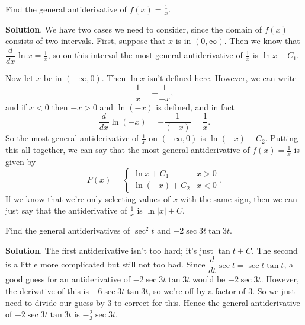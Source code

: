 \documentclass[10pt,]{book}
\theoremstyle{ptxplainnotitle}
\theoremstyle{ptxplaintitle}
\theoremstyle{ptxplainnotitle}
\theoremstyle{ptxplaintitle}
\theoremstyle{ptxplainnotitle}
\theoremstyle{ptxplaintitle}
\theoremstyle{ptxdefinitionnotitle}
\theoremstyle{ptxdefinitiontitle}
\theoremstyle{ptxdefinitionnotitle}
\theoremstyle{ptxdefinitiontitle}
\theoremstyle{ptxdefinitionnotitle}
\theoremstyle{ptxdefinitiontitle}
\theoremstyle{ptxdefinitionnotitle}
\theoremstyle{ptxdefinitiontitle}
\theoremstyle{ptxdefinitionnotitle}
\theoremstyle{ptxdefinitiontitle}
\numberwithin{equation}{section}
\newcommand{\dv}[3][]{\dfrac{d^{#1} #2}{d #3^{#1}}}
\begin{document}
\begin{example}\label{example-the-antiderivative-of--frac-1-x-m-}
\hypertarget{p-387}{}%
Find the general antiderivative of \(f(x) = \frac{1}{x}\).%
\par\smallskip%
\noindent\textbf{Solution}.\hypertarget{solution-86}{}\quad%
\hypertarget{p-388}{}%
We have two cases we need to consider, since the domain of \(f(x)\) consists of two intervals. First, suppose that \(x\) is in \((0,\infty)\). Then we know that \(\dv{}{x}\ln x = \frac{1}{x}\), so on this interval the most general antiderivative of \(\frac{1}{x}\) is \(\ln x + C_{1}\).%
\par
\hypertarget{p-389}{}%
Now let \(x\) be in \((-\infty,0)\). Then \(\ln x\) isn't defined here. However, we can write%
\begin{equation*}
\frac{1}{x} = -\frac{1}{-x},
\end{equation*}
and if \(x < 0\) then \(-x > 0\) and \(\ln(-x)\) is defined, and in fact%
\begin{equation*}
\dv{}{x}\ln(-x) = -\frac{1}{(-x)} = \frac{1}{x}.
\end{equation*}
So the most general antiderivative of \(\frac{1}{x}\) on \((-\infty,0)\) is \(\ln(-x) + C_{2}\). Putting this all together, we can say that the most general antiderivative of \(f(x) = \frac{1}{x}\) is given by%
\begin{equation*}
F(x) = \begin{cases} \ln x + C_{1} & x > 0 \\ \ln(-x) + C_{2} & x < 0\end{cases}.
\end{equation*}
If we know that we're only selecting values of \(x\) with the same sign, then we can just say that the antiderivative of \(\frac{1}{x}\) is \(\ln|x| + C\).%
\end{example}
\begin{example}\label{example-antiderivatives-involving-secant}
\hypertarget{p-390}{}%
Find the general antiderivatives of \(\sec^{2}t\) and \(-2\sec3t\tan3t\).%
\par\smallskip%
\noindent\textbf{Solution}.\hypertarget{solution-87}{}\quad%
\hypertarget{p-391}{}%
The first antiderivative isn't too hard; it's just \(\tan t+C\). The second is a little more complicated but still not too bad. Since \(\dv{}{t}\sec t = \sec t\tan t\), a good guess for an antiderivative of \(-2\sec3t\tan3t\) would be \(-2\sec3t.\) However, the derivative of this is \(-6\sec3t\tan3t\), so we're off by a factor of \(3\). So we just need to divide our guess by \(3\) to correct for this. Hence the general antiderivative of \(-2\sec3t\tan3t\) is \(-\frac{2}{3}\sec3t\).%
\end{example}
\end{document}
